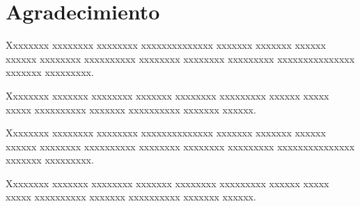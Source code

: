 \chapter*{Agradecimiento}

\vspace{2cm}

Xxxxxxxx xxxxxxxx xxxxxxxx xxxxxxxxxxxxxx xxxxxxx xxxxxxx xxxxxx xxxxxx xxxxxxxx xxxxxxxxxx xxxxxxxx xxxxxxxx xxxxxxxxx xxxxxxxxxxxxxxx xxxxxxx xxxxxxxxx.

Xxxxxxxx xxxxxxx xxxxxxxx xxxxxxx xxxxxxxx xxxxxxxxx xxxxxx xxxxx xxxxx xxxxxxxxxx xxxxxxx xxxxxxxxxx xxxxxxx xxxxxx.

Xxxxxxxx xxxxxxxx xxxxxxxx xxxxxxxxxxxxxx xxxxxxx xxxxxxx xxxxxx xxxxxx xxxxxxxx xxxxxxxxxx xxxxxxxx xxxxxxxx xxxxxxxxx xxxxxxxxxxxxxxx xxxxxxx xxxxxxxxx.

Xxxxxxxx xxxxxxx xxxxxxxx xxxxxxx xxxxxxxx xxxxxxxxx xxxxxx xxxxx xxxxx xxxxxxxxxx xxxxxxx xxxxxxxxxx xxxxxxx xxxxxx.